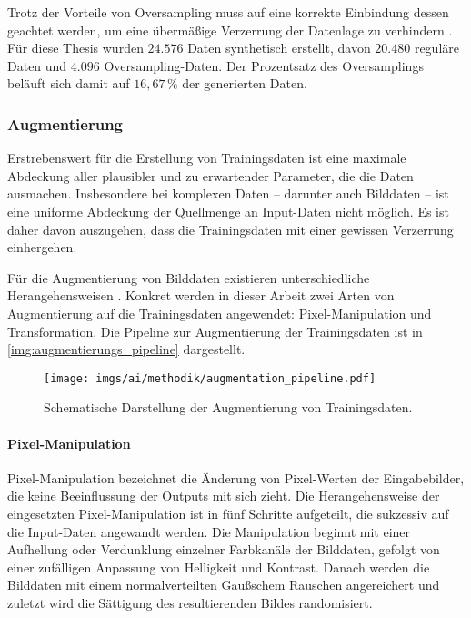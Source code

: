 Trotz der Vorteile von Oversampling muss auf eine korrekte Einbindung dessen geachtet werden, um eine übermäßige Verzerrung der Datenlage zu verhindern \cite{oversampling_bad}. Für diese Thesis wurden $24.576$ Daten synthetisch erstellt, davon $20.480$ reguläre Daten und $4.096$ Oversampling-Daten. Der Prozentsatz des Oversamplings beläuft sich damit auf $16,67\,\%$ der generierten Daten.


\subsubsection{Augmentierung}
\label{sec:daten_augmentierung}

Erstrebenswert für die Erstellung von Trainingsdaten ist eine maximale Abdeckung aller plausibler und zu erwartender Parameter, die die Daten ausmachen. Insbesondere bei komplexen Daten -- darunter auch Bilddaten -- ist eine uniforme Abdeckung der Quellmenge an Input-Daten nicht möglich. Es ist daher davon auszugehen, dass die Trainingsdaten mit einer gewissen Verzerrung einhergehen.

Für die Augmentierung von Bilddaten existieren unterschiedliche Herangehensweisen \cite{augmentierung_techniken}. Konkret werden in dieser Arbeit zwei Arten von Augmentierung auf die Trainingsdaten angewendet: Pixel-Manipulation und Transformation. Die Pipeline zur Augmentierung der Trainingsdaten ist in \autoref{img:augmentierungs_pipeline} dargestellt.

\begin{figure}
    \centering
    \texttt{[image: imgs/ai/methodik/augmentation\_pipeline.pdf]}
    \caption{Schematische Darstellung der Augmentierung von Trainingsdaten.}
    \label{img:augmentierungs_pipeline}
\end{figure}

\paragraph{Pixel-Manipulation}

Pixel-Manipulation bezeichnet die Änderung von Pixel-Werten der Eingabebilder, die keine Beeinflussung der Outputs mit sich zieht. Die Herangehensweise der eingesetzten Pixel-Manipulation ist in fünf Schritte aufgeteilt, die sukzessiv auf die Input-Daten angewandt werden. Die Manipulation beginnt mit einer Aufhellung oder Verdunklung einzelner Farbkanäle der Bilddaten, gefolgt von einer zufälligen Anpassung von Helligkeit und Kontrast. Danach werden die Bilddaten mit einem normalverteilten Gaußschem Rauschen angereichert und zuletzt wird die Sättigung des resultierenden Bildes randomisiert.

